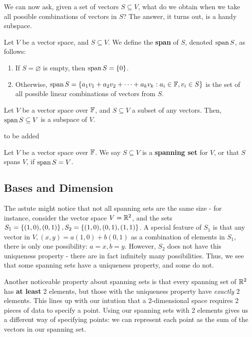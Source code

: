 \documentclass{article}
\begin{document}
We can now ask, given a set of vectors $ S \subseteq V $, what do we obtain when we take all possible combinations of vectors in $ S $?
The answer, it turns out, is a handy subspace.

\begin{defn}
Let $ V $ be a vector space, and $ S \subseteq V $. We define the \textbf{span} of $ S $, denoted $ \operatorname{span}{S} $, as follows:
\begin{enumerate}
    \item If $ S = \varnothing $ is empty, then $ \operatorname{span}{S} = \left\{{0}\right\} $.
    \item Otherwise, $ \operatorname{span}{S} = \left\{{a_{1}v_{1} + a_{2}v_{2} + \dots + a_{k}v_{k} : a_{i} \in \mathbb{F}, v_{i} \in S}\right\} $ is the set of all possible linear combinations of vectors from $ S $.
\end{enumerate}
\end{defn}

\begin{thm}
Let $ V $ be a vector space over $ \mathbb{F} $, and $ S \subseteq V $ a subset of any vectors. Then, $ \operatorname{span}{S} \subseteq V $ is a subspace of $ V $.
\end{thm}

\begin{pf}[source=Primary Source Material]
to be added
\end{pf}

\begin{lm}
Let $ V $ be a vector space over $ \mathbb{F} $. We say $ S \subseteq V $ is a \textbf{spanning set} for $ V $, or that $ S $ spans $ V $, if $ \operatorname{span}{S} = V $.
\end{lm}

\subsection{Bases and Dimension}

The astute might notice that not all spanning sets are the same size - for instance, consider the vector space $ V = \mathbb{R}^{2} $, and the sets $ S_{1} = \left\{{(1, 0), (0, 1)}\right\}, S_{2} = \left\{{(1, 0), (0, 1), (1, 1)}\right\} $.
A special feature of $ S_{1} $ is that any vector in $ V, (x, y) = a(1, 0) + b (0, 1) $ as a combination of elements in $ S_{1} $, there is only one possibility: $ a = x, b = y $.
However, $ S_{2} $ does not have this uniqueness property - there are in fact infinitely many possibilities. Thus, we see that some spanning sets have a uniqueness property, and some do not. \npgh

Another noticeable property about spanning sets is that every spanning set of $ \mathbb{R}^{2} $ has \textbf{at least} 2 elements, but those with the uniqueness property have \textit{exactly} 2 elements.
This lines up with our intution that a 2-dimensional space requires 2 pieces of data to specify a point. Using our spanning sets with 2 elements gives us a different way of specifying points: we can represent
each point as the sum of the vectors in our spanning set. \npgh
\end{document}
